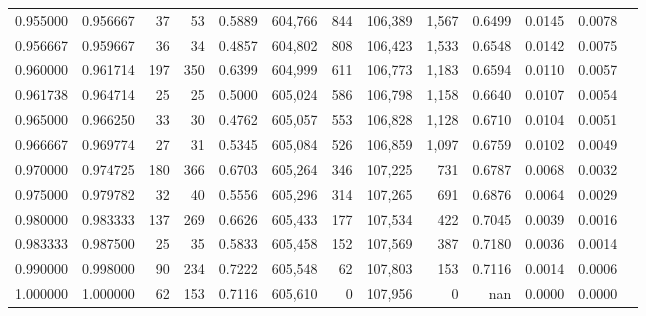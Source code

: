 \begin{tabular}{rrrrrrrrrrrrr}
0.955000 & 0.956667 &    37 &  53 &                                     0.5889 & 604,766 &     844 & 106,389 &   1,567 & 0.6499 & 0.0145 & 0.0078 \\
0.956667 & 0.959667 &    36 &  34 &                                     0.4857 & 604,802 &     808 & 106,423 &   1,533 & 0.6548 & 0.0142 & 0.0075 \\
0.960000 & 0.961714 &   197 & 350 &                                     0.6399 & 604,999 &     611 & 106,773 &   1,183 & 0.6594 & 0.0110 & 0.0057 \\
0.961738 & 0.964714 &    25 &  25 &                                     0.5000 & 605,024 &     586 & 106,798 &   1,158 & 0.6640 & 0.0107 & 0.0054 \\
0.965000 & 0.966250 &    33 &  30 &                                     0.4762 & 605,057 &     553 & 106,828 &   1,128 & 0.6710 & 0.0104 & 0.0051 \\
0.966667 & 0.969774 &    27 &  31 &                                     0.5345 & 605,084 &     526 & 106,859 &   1,097 & 0.6759 & 0.0102 & 0.0049 \\
0.970000 & 0.974725 &   180 & 366 &                                     0.6703 & 605,264 &     346 & 107,225 &     731 & 0.6787 & 0.0068 & 0.0032 \\
0.975000 & 0.979782 &    32 &  40 &                                     0.5556 & 605,296 &     314 & 107,265 &     691 & 0.6876 & 0.0064 & 0.0029 \\
0.980000 & 0.983333 &   137 & 269 &                                     0.6626 & 605,433 &     177 & 107,534 &     422 & 0.7045 & 0.0039 & 0.0016 \\
0.983333 & 0.987500 &    25 &  35 &                                     0.5833 & 605,458 &     152 & 107,569 &     387 & 0.7180 & 0.0036 & 0.0014 \\
0.990000 & 0.998000 &    90 & 234 &                                     0.7222 & 605,548 &      62 & 107,803 &     153 & 0.7116 & 0.0014 & 0.0006 \\
1.000000 & 1.000000 &    62 & 153 &                                     0.7116 & 605,610 &       0 & 107,956 &       0 &    nan & 0.0000 & 0.0000 \\
\bottomrule
\end{tabular}
